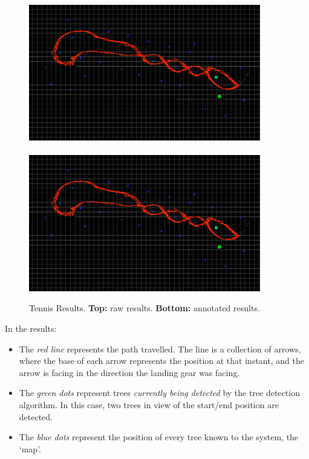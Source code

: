\documentclass[12pt,oneside,a4paper,draft]{book}
\begin{document}
\begin{figure}
  \centering
  \includegraphics[width=0.9\textwidth]{figs/tennis-results}\\
  ~\\
  \includegraphics[width=0.9\textwidth]{figs/tennis-results-annotated}
  \caption{Tennis Results. \textbf{Top:} raw results. \textbf{Bottom:}
  annotated results.}
  \label{fig:tennis-results}
\end{figure}

In the results:
\begin{itemize}
\item The \emph{red line} represents the path travelled. The line is a
  collection of arrows, where the base of each arrow represents the
  position at that instant, and the arrow is facing in the direction
  the landing gear was facing.
\item The \emph{green dots} represent trees \emph{currently being
    detected} by the tree detection algorithm. In this case, two trees
  in view of the start/end position are detected.
\item The \emph{blue dots} represent the position of every tree known
  to the system, the `map'.
\end{itemize}
\end{document}
